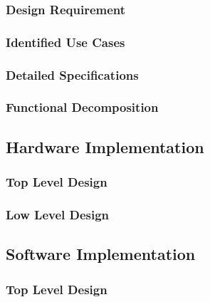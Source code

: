 \documentclass[12pt]{article} %
\begin{document}
\subsubsection{Design Requirement\label{sec:requirements}} %

\subsubsection{Identified Use Cases\label{sec:identifiedUseCases}} %

\subsubsection{Detailed Specifications\label{detailedSpec}} %

\subsubsection{Functional Decomposition\label{functions}} %

\subsection{Hardware Implementation\label{hwImplementation}} 

\subsubsection{Top Level Design\label{hwTopLevel}} %

\subsubsection{Low Level Design\label{hwLowLevel}} %

\subsection{Software Implementation\label{swImplementation}}
%
%

\subsubsection{Top Level Design\label{swTopLevel}} %
%
\end{document}
